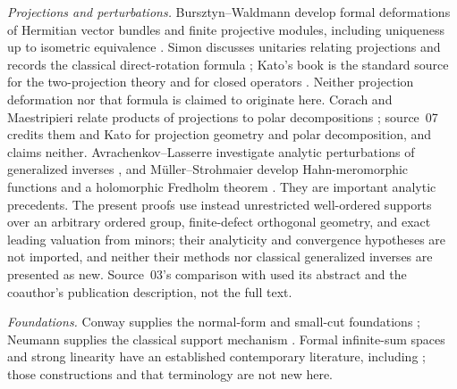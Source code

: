 \documentclass[11pt,letterpaper]{article}
\numberwithin{equation}{section}
\theoremstyle{definition}
\theoremstyle{remark}
\begin{document}
\emph{Projections and perturbations.} Bursztyn--Waldmann develop formal
deformations of Hermitian vector bundles and finite projective modules,
including uniqueness up to isometric equivalence \cite{BW}. Simon discusses
unitaries relating projections and records the classical direct-rotation
formula \cite{Simon,SimonKato}; Kato's book is the standard source for the
two-projection theory and for closed operators \cite{Kato}. Neither
projection deformation nor that formula is claimed to originate here.
Corach and Maestripieri relate products of projections to polar
decompositions \cite{CorachMaestripieri}; source~07 credits them and Kato for
projection geometry and polar decomposition, and claims neither.
Avrachenkov--Lasserre investigate analytic perturbations of generalized
inverses \cite{Avrachenkov}, and M\"uller--Strohmaier develop
Hahn-meromorphic functions and a holomorphic Fredholm theorem \cite{MS}. They
are important analytic precedents. The present proofs use instead
unrestricted well-ordered supports over an arbitrary ordered group,
finite-defect orthogonal geometry, and exact leading valuation from minors;
their analyticity and convergence hypotheses are not imported, and neither
their methods nor classical generalized inverses are presented as new.
Source~03's comparison with \cite{Avrachenkov} used its abstract and the
coauthor's publication description, not the full text.

\emph{Foundations.} Conway supplies the normal-form and small-cut
foundations \cite{Conway}; Neumann supplies the classical support mechanism
\cite{Neumann}. Formal infinite-sum spaces and strong linearity have an
established contemporary literature, including \cite{Bagayoko,Freni}; those
constructions and that terminology are not new here.
\end{document}
